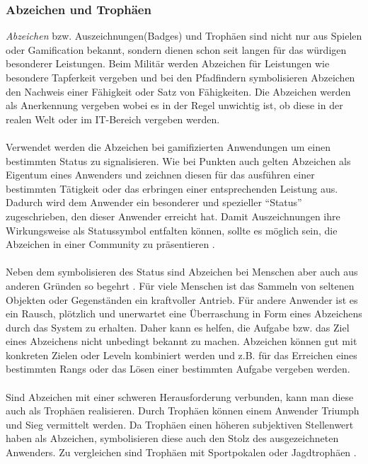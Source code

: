 \documentclass[a4paper,12pt]{scrartcl}
\begin{document}
\subsubsection{Abzeichen und Trophäen} 
\textit{Abzeichen} bzw. Auszeichnungen(Badges) und Trophäen sind nicht nur aus Spielen oder Gamification bekannt, sondern dienen schon seit langen für das würdigen besonderer Leistungen. Beim Militär werden Abzeichen für Leistungen wie besondere Tapferkeit vergeben und bei den Pfadfindern symbolisieren Abzeichen den Nachweis einer Fähigkeit oder Satz von Fähigkeiten. Die Abzeichen werden als Anerkennung vergeben wobei es in der Regel unwichtig ist, ob diese in der realen Welt oder im IT-Bereich vergeben werden. 
\\\\
Verwendet werden die Abzeichen bei gamifizierten Anwendungen um einen bestimmten Status zu signalisieren. Wie bei Punkten auch gelten Abzeichen als Eigentum eines Anwenders und zeichnen diesen für das ausführen einer bestimmten Tätigkeit oder das erbringen einer entsprechenden Leistung aus. Dadurch wird dem Anwender ein besonderer und spezieller \enquote{Status} zugeschrieben, den dieser Anwender erreicht hat. Damit Auszeichnungen ihre Wirkungsweise als Statussymbol entfalten können, sollte es möglich sein, die Abzeichen in einer Community zu präsentieren \cite{Zichermann2011}.    
\\\\
Neben dem symbolisieren des Status sind Abzeichen bei Menschen aber auch aus anderen Gründen so begehrt \cite{Zichermann2011}. Für viele Menschen ist das Sammeln von seltenen Objekten oder Gegenständen ein kraftvoller Antrieb. Für andere Anwender ist es ein Rausch, plötzlich und unerwartet eine Überraschung in Form eines Abzeichens durch das System zu erhalten. Daher kann es helfen, die Aufgabe bzw. das Ziel eines Abzeichens nicht unbedingt bekannt zu machen. Abzeichen können gut mit konkreten Zielen oder Leveln kombiniert werden und z.B. für das Erreichen eines bestimmten Rangs oder das Lösen einer bestimmten Aufgabe vergeben werden.
\\\\
Sind Abzeichen mit einer schweren Herausforderung verbunden, kann man diese auch als Trophäen realisieren. Durch Trophäen können einem Anwender Triumph und Sieg vermittelt werden. Da Trophäen einen höheren subjektiven Stellenwert haben als Abzeichen, symbolisieren diese auch den Stolz des ausgezeichneten Anwenders. Zu vergleichen sind Trophäen mit Sportpokalen oder Jagdtrophäen \cite{Zichermann2011}.   
\end{document}
